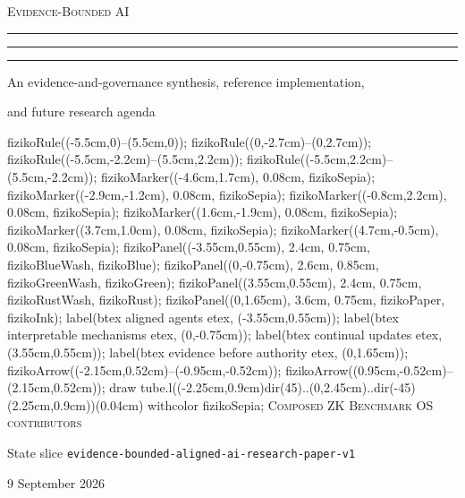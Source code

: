 \documentclass[11pt,twoside]{article}
\newcommand{\printerrule}{%
  \par\vspace{0.55em}
  \begin{center}
    \rule{0.19\linewidth}{0.35pt}\hspace{0.45em}%
    \rule{0.075\linewidth}{1.05pt}\hspace{0.45em}%
    \rule{0.19\linewidth}{0.35pt}
  \end{center}
  \vspace{0.15em}
}
\newcommand{\state}[1]{\texttt{\small #1}}
\begin{document}
\begin{titlepage}
  \thispagestyle{empty}
  \centering
    \vspace*{0.55cm}
    {\small{}}\par
    \vspace{0.7em}
    {\fontsize{31}{35}\selectfont\textsc{Evidence-Bounded AI}}\par
    \vspace{0.55em}
    {\large{}}\par
    \vspace{0.2em}
    {\large{}}\par
    \printerrule
    {\small An evidence-and-governance synthesis, reference implementation,\par
    and future research agenda}\par
    \vspace{1.2em}\par
    \mpfig
      fizikoRule((-5.5cm,0)--(5.5cm,0));
      fizikoRule((0,-2.7cm)--(0,2.7cm));
      fizikoRule((-5.5cm,-2.2cm)--(5.5cm,2.2cm));
      fizikoRule((-5.5cm,2.2cm)--(5.5cm,-2.2cm));
      fizikoMarker((-4.6cm,1.7cm), 0.08cm, fizikoSepia);
      fizikoMarker((-2.9cm,-1.2cm), 0.08cm, fizikoSepia);
      fizikoMarker((-0.8cm,2.2cm), 0.08cm, fizikoSepia);
      fizikoMarker((1.6cm,-1.9cm), 0.08cm, fizikoSepia);
      fizikoMarker((3.7cm,1.0cm), 0.08cm, fizikoSepia);
      fizikoMarker((4.7cm,-0.5cm), 0.08cm, fizikoSepia);
      fizikoPanel((-3.55cm,0.55cm), 2.4cm, 0.75cm, fizikoBlueWash, fizikoBlue);
      fizikoPanel((0,-0.75cm), 2.6cm, 0.85cm, fizikoGreenWash, fizikoGreen);
      fizikoPanel((3.55cm,0.55cm), 2.4cm, 0.75cm, fizikoRustWash, fizikoRust);
      fizikoPanel((0,1.65cm), 3.6cm, 0.75cm, fizikoPaper, fizikoInk);
      label(btex \scriptsize aligned agents etex, (-3.55cm,0.55cm));
      label(btex \scriptsize interpretable mechanisms etex, (0,-0.75cm));
      label(btex \scriptsize continual updates etex, (3.55cm,0.55cm));
      label(btex \scriptsize evidence before authority etex, (0,1.65cm));
      fizikoArrow((-2.15cm,0.52cm)--(-0.95cm,-0.52cm));
      fizikoArrow((0.95cm,-0.52cm)--(2.15cm,0.52cm));
      draw tube.l((-2.25cm,0.9cm){dir(45)}..(0,2.45cm)..{dir(-45)}(2.25cm,0.9cm))(0.04cm) withcolor fizikoSepia;
    \endmpfig
    \vfill
    {\small\textsc{Composed ZK Benchmark OS contributors}}\par
    \vspace{0.35em}
    {\small State slice \state{evidence-bounded-aligned-ai-research-paper-v1}}\par
    \vspace{0.2em}
    {\small 9 September 2026}
\end{titlepage}
\end{document}
